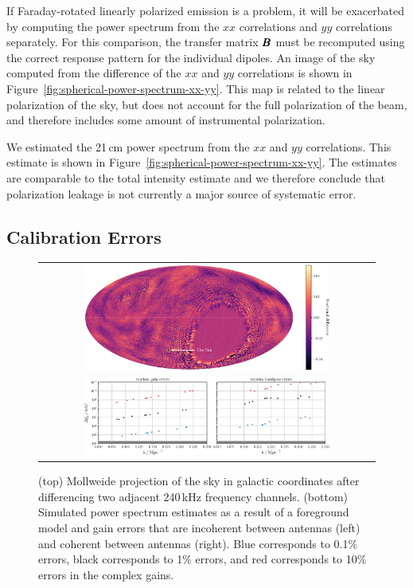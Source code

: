 \begin{bibunit}
If Faraday-rotated linearly polarized emission is a problem, it will be exacerbated by computing the
power spectrum from the $xx$ correlations and $yy$ correlations separately. For this comparison, the
transfer matrix $\pmb B$ must be recomputed using the correct response pattern for the individual
dipoles. An image of the sky computed from the difference of the $xx$ and $yy$ correlations is shown
in Figure~\ref{fig:spherical-power-spectrum-xx-yy}. This map is related to the linear polarization
of the sky, but does not account for the full polarization of the beam, and therefore includes some
amount of instrumental polarization.

We estimated the 21\,cm power spectrum from the $xx$ and $yy$ correlations. This estimate is shown
in Figure~\ref{fig:spherical-power-spectrum-xx-yy}. The estimates are comparable to the total
intensity estimate and we therefore conclude that polarization leakage is not currently a major
source of systematic error.

\subsection{Calibration Errors}\label{sec:calibration-errors}

\begin{figure}
    \centering
    \begin{tabular}{c}
        \includegraphics[width=0.75\textwidth]{figures/chapter4/channel-difference-sky-map-colorbar}\\
        \includegraphics[width=0.75\textwidth]{figures/chapter4/spherical-power-spectrum-gain-errors}\\
    \end{tabular}
    \caption{
        (top) Mollweide projection of the sky in galactic coordinates after differencing two
        adjacent 240\,kHz frequency channels.
        (bottom) Simulated power spectrum estimates as a result of a foreground model and gain
        errors that are incoherent between antennas (left) and coherent between antennas (right).
        Blue corresponds to 0.1\% errors, black corresponds to 1\% errors, and red corresponds to
        10\% errors in the complex gains.
    }
    \label{fig:spherical-power-spectrum-gain-errors}
\end{figure}


\end{bibunit}

